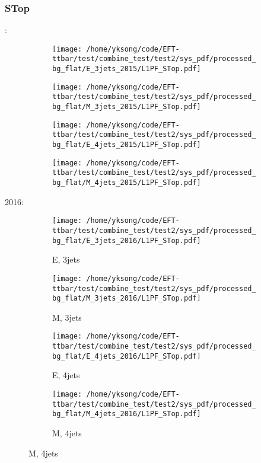 \documentclass{beamer}
\begin{document}
\begin{frame}
\frametitle{STop}
\fontsize{5}{1}:
\begin{figure}
\centering
\begin{subfigure}[b]{0.24\textwidth}
\texttt{[image: /home/yksong/code/EFT-ttbar/test/combine\_test/test2/sys\_pdf/processed\_bg\_flat/E\_3jets\_2015/L1PF\_STop.pdf]}
\end{subfigure}
\begin{subfigure}[b]{0.24\textwidth}
\texttt{[image: /home/yksong/code/EFT-ttbar/test/combine\_test/test2/sys\_pdf/processed\_bg\_flat/M\_3jets\_2015/L1PF\_STop.pdf]}
\end{subfigure}
\begin{subfigure}[b]{0.24\textwidth}
\texttt{[image: /home/yksong/code/EFT-ttbar/test/combine\_test/test2/sys\_pdf/processed\_bg\_flat/E\_4jets\_2015/L1PF\_STop.pdf]}
\end{subfigure}
\begin{subfigure}[b]{0.24\textwidth}
\texttt{[image: /home/yksong/code/EFT-ttbar/test/combine\_test/test2/sys\_pdf/processed\_bg\_flat/M\_4jets\_2015/L1PF\_STop.pdf]}
\end{subfigure}
\end{figure}
2016:
\begin{figure}
\centering
\begin{subfigure}[b]{0.24\textwidth}
\texttt{[image: /home/yksong/code/EFT-ttbar/test/combine\_test/test2/sys\_pdf/processed\_bg\_flat/E\_3jets\_2016/L1PF\_STop.pdf]}
\captionsetup{font=tiny}
\caption{E, 3jets}
\end{subfigure}
\begin{subfigure}[b]{0.24\textwidth}
\texttt{[image: /home/yksong/code/EFT-ttbar/test/combine\_test/test2/sys\_pdf/processed\_bg\_flat/M\_3jets\_2016/L1PF\_STop.pdf]}
\captionsetup{font=tiny}
\caption{M, 3jets}
\end{subfigure}
\begin{subfigure}[b]{0.24\textwidth}
\texttt{[image: /home/yksong/code/EFT-ttbar/test/combine\_test/test2/sys\_pdf/processed\_bg\_flat/E\_4jets\_2016/L1PF\_STop.pdf]}
\captionsetup{font=tiny}
\caption{E, 4jets}
\end{subfigure}
\begin{subfigure}[b]{0.24\textwidth}
\texttt{[image: /home/yksong/code/EFT-ttbar/test/combine\_test/test2/sys\_pdf/processed\_bg\_flat/M\_4jets\_2016/L1PF\_STop.pdf]}
\captionsetup{font=tiny}
\caption{M, 4jets}
\end{subfigure}
\end{figure}
\end{frame}
\end{document}
